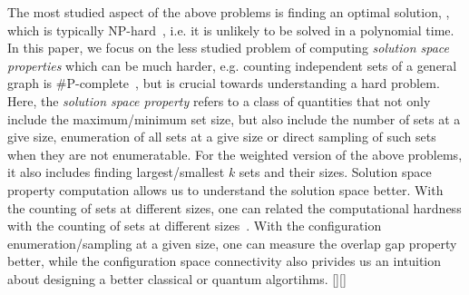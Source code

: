 \documentclass[onefignum, onetabnum]{siamart190516}
\newcommand{\<}{\langle}
\renewcommand{\>}{\rangle}
\newcommand{\blue}[1]{[{\bf  \color{blue}{JG: #1}}]}
\newcommand{\purple}[1]{[{\bf  \color{purple}{MC: #1}}]}
\newcounter{example}
\begin{document}
The most studied aspect of the above problems is finding an optimal solution, 
, which is typically 
NP-hard~\cite{Hastad1996}, i.e. it is unlikely to be solved in a polynomial time.
In this paper, we focus on the less studied problem of computing \textit{solution space properties}  which can be much harder, e.g. counting independent sets of a general graph is \#P-complete~\cite{Vadhan2001}, but is crucial towards understanding a hard problem.
Here, the \textit{solution space property} refers to a class of quantities that not only include the maximum/minimum set size,
but also include the number of sets at a give size, enumeration of all sets at a give size or direct sampling of such sets when they are not enumeratable.
For the weighted version of the above problems, it also includes finding largest/smallest $k$ sets and their sizes.
Solution space property computation allows us to understand the solution space better.
With the counting of sets at different sizes, one can related the computational hardness with the counting of sets at different sizes~\cite{Xu2018}.
With the configuration enumeration/sampling at a given size, one can measure the overlap gap property~\cite{Gamarnik2013, Gamarnik2019} better,
while the configuration space connectivity also privides us an intuition about designing a better classical or quantum algortihms.
\purple{I would give examples of why we want to compute solution space
properties.
For instance, in statistical physics, computing thermal states and
observables via the partition function. In complexity theory, proving limits on local
algorithms (OGP).}\blue{now?}
\end{document}

